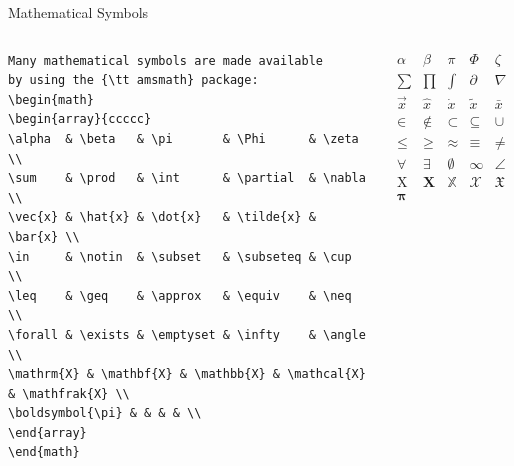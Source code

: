 \documentclass[aspectratio=1610]{beamer}
\let\oldfootnotesize\footnotesize
\renewcommand*{\footnotesize}{\oldfootnotesize\tiny}
\begin{document}
\begin{frame}[fragile]{Mathematical Symbols}
  \begin{columns}[T]
      \begin{lstlisting}[basicstyle=\footnotesize\ttfamily\color{wcprimary}]
Many mathematical symbols are made available 
by using the {\tt amsmath} package:
\begin{math}
\begin{array}{ccccc}
\alpha  & \beta   & \pi       & \Phi      & \zeta   \\
\sum    & \prod   & \int      & \partial  & \nabla  \\
\vec{x} & \hat{x} & \dot{x}   & \tilde{x} & \bar{x} \\
\in     & \notin  & \subset   & \subseteq & \cup    \\
\leq    & \geq    & \approx   & \equiv    & \neq    \\
\forall & \exists & \emptyset & \infty    & \angle  \\
\mathrm{X} & \mathbf{X} & \mathbb{X} & \mathcal{X} 
& \mathfrak{X} \\ 
\boldsymbol{\pi} & & & & \\  
\end{array}
\end{math}

      \end{lstlisting}
\begin{math}
\begin{array}{ccccc}
\alpha  & \beta   & \pi       & \Phi      & \zeta   \\
\sum    & \prod   & \int      & \partial  & \nabla  \\
\vec{x} & \hat{x} & \dot{x}   & \tilde{x} & \bar{x} \\
\in     & \notin  & \subset   & \subseteq & \cup    \\
\leq    & \geq    & \approx   & \equiv    & \neq    \\
\forall & \exists & \emptyset & \infty    & \angle  \\
\mathrm{X} & \mathbf{X} & \mathbb{X} & \mathcal{X} 
& \mathfrak{X} \\ 
\boldsymbol{\pi} & & & & \\  
\end{array}
\end{math}
  \end{columns}
\end{frame}
\end{document}
